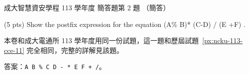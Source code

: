 \begin{pastexam}[label={px:ncku-113-isec-11}]{成大智慧資安學程 113 學年度 簡答題第 2 題}
（簡答）

(5 pts) Show the postfix expression for the equation (A\% B)* (C-D) / (E +F) .
\end{pastexam}

\begin{pastsoln}
本卷和成大電通所 113 學年度用同一份試題，這一題和歷屆試題~\ref{px:ncku-113-cce-11} 完全相同，完整的詳解見該題。

答案：\texttt{A B \% C D - * E F + /}。
\end{pastsoln}
